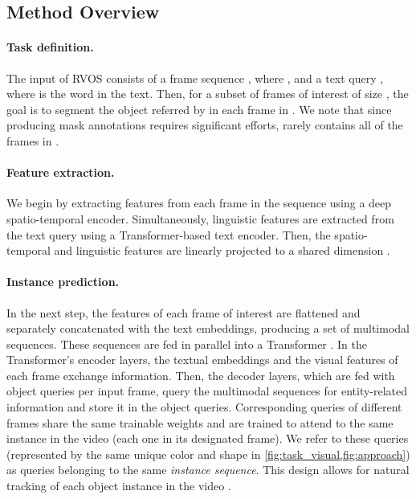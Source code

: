 \documentclass[10pt,twocolumn,letterpaper]{article}
\renewcommand{\cite}[1]{\citep{#1}}
\begin{document}
\subsection{Method Overview}
\label{sec:overview}


\paragraph{Task definition.} The input of RVOS consists of a frame sequence , where , and a text query , where  is the  word in the text. Then, for a subset of frames of interest  of size , the goal is to segment the object referred by  in each frame in . 
We note that since producing mask annotations requires significant  efforts,  rarely contains all of the frames in . 


\paragraph{Feature extraction.} 
We begin by extracting features from each frame in the sequence  using a deep spatio-temporal encoder. Simultaneously, linguistic features are extracted from the text query  using a Transformer-based \cite{vaswani2017attention} text encoder. Then, the spatio-temporal and linguistic features are linearly projected to a shared dimension .

\paragraph{Instance prediction.}
In the next step, the features of each frame of interest are flattened and separately concatenated with the text embeddings, producing a set of  multimodal sequences. These sequences are fed in parallel into a Transformer \cite{vaswani2017attention,carion2020detr}. In the Transformer's encoder layers, the textual embeddings and the visual features of each frame exchange information. Then, the decoder layers, which are fed with  object queries per input frame, query the multimodal sequences for entity-related information and store it in the object queries. Corresponding queries of different frames share the same trainable weights and are trained to attend to the same instance in the video (each one in its designated frame). We refer to these queries (represented by the same unique color and shape in \cref{fig:task_visual,fig:approach}) as queries belonging to the same \textit{instance sequence}. This design allows for natural tracking of each object instance in the video \cite{wang2021vistr}.
\end{document}
